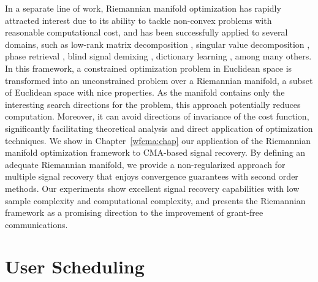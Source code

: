 In a separate line of work, Riemannian manifold optimization \cite{Absil2008book} has rapidly attracted interest due to its ability to tackle non-convex problems with reasonable computational cost, and has been successfully applied to several domains, such as low-rank matrix decomposition \cite{Yang2016lowrankfogran}, singular value decomposition \cite{Sato2014complexstiefel}, phase retrieval \cite{Huang2016phaseliftriemann}, blind signal demixing \cite{Dong2019blinddemixingrtr}, dictionary learning \cite{Cherian2015riemanniandictionary,Sun2017riemanniandictionary}, among many others.
In this framework, a constrained optimization problem in Euclidean space is transformed into an unconstrained problem over a Riemannian manifold, a subset of Euclidean space with nice properties. 
As the manifold contains only the interesting search directions for the problem, this approach potentially reduces computation. Moreover, it can avoid directions of invariance of the cost function, significantly facilitating theoretical analysis and direct application of optimization techniques. 
We show in Chapter~\ref{wfcma:chap} our application of the Riemannian manifold optimization framework to CMA-based signal recovery. By defining an adequate Riemannian manifold, we provide a non-regularized approach for multiple signal recovery that enjoys convergence guarantees with second order methods. Our experiments show excellent signal recovery capabilities with low sample complexity and computational complexity, and presents the Riemannian framework as a promising direction to the improvement of grant-free communications. 





\section{User Scheduling} \label{system:sec:usch}

